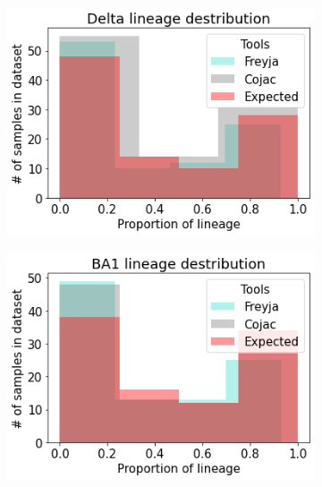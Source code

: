         \begin{figure}[H]
            \centering
            \begin{subfigure}[b]{0.3\textwidth}
            \includegraphics[width=1\textwidth]{figures/results/mock/distr-delta.png}
            \label{fig:results:mock:dist-delta-all}
            \end{subfigure}
            \hfill
            \begin{subfigure}[b]{0.3\textwidth}
            \includegraphics[width=1\textwidth]{figures/results/mock/distr-ba1.png}
            \label{fig:results:mock:dist-ba2-all}
            \end{subfigure}

\end{figure}
